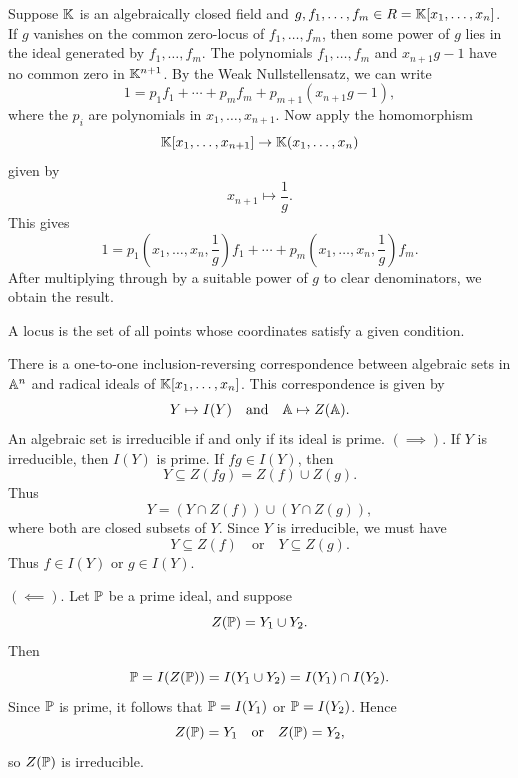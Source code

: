 \begin{theorem}{
    Suppose $\kk$ is an algebraically closed field and $g,f_1,\ldots,f_m\in R = \kk[x_1,\ldots,x_n]$.
    If $g$ vanishes on the common zero-locus of $f_1,\ldots,f_m$, then some power of $g$ lies in the ideal generated by $f_1,\ldots,f_m$.
}
The polynomials $f_1,\ldots,f_m$ and $x_{n+1}g - 1$ have no common zero in $\kk^{n+1}$.
By the Weak Nullstellensatz, we can write
\[
    1 = p_{1}f_1+\cdots+p_{m}f_m+p_{m+1}(x_{n+1}g-1),
\]
where the $p_i$ are polynomials in $x_1,\ldots,x_{n+1}$.
Now apply the homomorphism
\[
    \kk[x_1,\ldots,x_{n+1}] \to \kk(x_1,\ldots,x_n)
\]
given by
\[
    x_{n+1}\mapsto \frac{1}{g}.
\]
This gives
\[
    1 = p_1\!\left(x_1,\ldots,x_n,\frac{1}{g}\right)f_1+\cdots+p_m\!\left(x_1,\ldots,x_n,\frac{1}{g}\right)f_m.
\]
After multiplying through by a suitable power of $g$ to clear denominators, we obtain the result.
\end{theorem}

\begin{definition}[Locus]
    A locus is the set of all points whose coordinates satisfy a given condition.
\end{definition}

\begin{corollary}{
    There is a one-to-one inclusion-reversing correspondence between algebraic sets in $\aa^n$ and radical ideals of $\kk[x_1,\ldots,x_n]$.
    This correspondence is given by
    \[
        Y \mapsto I(Y)
        \quad\text{and}\quad
        \aa \mapsto Z(\aa).
    \]
    An algebraic set is irreducible if and only if its ideal is prime.
}
    $(\implies)$.
    If $Y$ is irreducible, then $I(Y)$ is prime.
    If $fg\in I(Y)$, then
    \[
        Y\subseteq Z(fg) = Z(f)\cup Z(g).
    \]
    Thus
    \[
        Y = (Y\cap Z(f))\cup (Y\cap Z(g)),
    \]
    where both are closed subsets of $Y$.
    Since $Y$ is irreducible, we must have
    \[
        Y\subseteq Z(f)
        \quad\text{or}\quad
        Y\subseteq Z(g).
    \]
    Thus $f\in I(Y)$ or $g\in I(Y)$.

    $(\impliedby)$.
    Let $\pp$ be a prime ideal, and suppose
    \[
        Z(\pp) = Y_1\cup Y_2.
    \]
    Then
    \[
        \pp = I(Z(\pp)) = I(Y_1\cup Y_2) = I(Y_1)\cap I(Y_2).
    \]
    Since $\pp$ is prime, it follows that $\pp = I(Y_1)$ or $\pp = I(Y_2)$.
    Hence
    \[
        Z(\pp) = Y_1
        \quad\text{or}\quad
        Z(\pp) = Y_2,
    \]
    so $Z(\pp)$ is irreducible.
\end{corollary}

